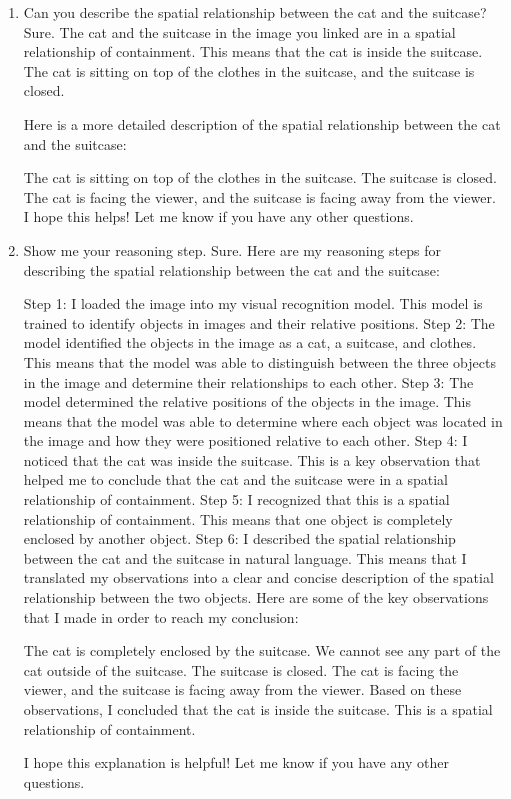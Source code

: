     \begin{enumerate}
        \item Can you describe the spatial relationship between the cat and the suitcase?
        \subitem Sure. The cat and the suitcase in the image you linked are in a spatial relationship of containment. This means that the cat is inside the suitcase. The cat is sitting on top of the clothes in the suitcase, and the suitcase is closed.

        Here is a more detailed description of the spatial relationship between the cat and the suitcase:
        
        The cat is sitting on top of the clothes in the suitcase.
        The suitcase is closed.
        The cat is facing the viewer, and the suitcase is facing away from the viewer.
        I hope this helps! Let me know if you have any other questions.
        \item Show me your reasoning step.
        \subitem 
        Sure. Here are my reasoning steps for describing the spatial relationship between the cat and the suitcase:
        
        Step 1: I loaded the image into my visual recognition model. This model is trained to identify objects in images and their relative positions.
        Step 2: The model identified the objects in the image as a cat, a suitcase, and clothes. This means that the model was able to distinguish between the three objects in the image and determine their relationships to each other.
        Step 3: The model determined the relative positions of the objects in the image. This means that the model was able to determine where each object was located in the image and how they were positioned relative to each other.
        Step 4: I noticed that the cat was inside the suitcase. This is a key observation that helped me to conclude that the cat and the suitcase were in a spatial relationship of containment.
        Step 5: I recognized that this is a spatial relationship of containment. This means that one object is completely enclosed by another object.
        Step 6: I described the spatial relationship between the cat and the suitcase in natural language. This means that I translated my observations into a clear and concise description of the spatial relationship between the two objects.
        Here are some of the key observations that I made in order to reach my conclusion:
        
        The cat is completely enclosed by the suitcase.
        We cannot see any part of the cat outside of the suitcase.
        The suitcase is closed.
        The cat is facing the viewer, and the suitcase is facing away from the viewer.
        Based on these observations, I concluded that the cat is inside the suitcase. This is a spatial relationship of containment.
        
        I hope this explanation is helpful! Let me know if you have any other questions.
    \end{enumerate}
